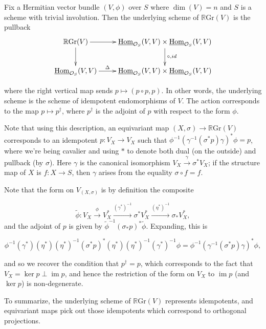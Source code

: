 \documentclass[edeposit,fullpage]{uiucthesis2009}
\newcommand{\mc}{\mathcal}
\newcommand{\RGr}{\mathbb R\mathrm{Gr}}
\DeclareMathOperator*{\im}{im}
\DeclareMathOperator{\Hom}{Hom}
\theoremstyle{plain}
\numberwithin{lemma}{section}
\theoremstyle{definition}
\begin{document}
Fix a Hermitian vector bundle $(V,\phi)$ over $S$ where $\dim(V) = n$
and $S$ is a scheme with
trivial involution. Then the underlying scheme of $\RGr(V)$ is the
pullback 
\[
\xymatrix{\RGr(V) \ar[r]\ar[d] & \uline{\Hom}_{\mc O_S}(V,V) \times
  \uline{\Hom}_{\mc O_S}(V,V) \ar[d]^{\circ, id} \\ \uline{\Hom}_{\mc
    O_S}(V,V) \ar[r]^-\Delta & \uline{\Hom}_{\mc O_S}(V,V) \times \uline{\Hom}_{\mc O_S}(V,V)}
\]

where the right vertical map sends $p \mapsto (p \circ p, p)$. In
other words, the underlying scheme is the scheme of idempotent
endomorphisms of $V$. The action corresponds to the map $p \mapsto
p^\dagger$, where $p^\dagger$ is the adjoint of $p$ with respect to
the form $\phi$. 

Note that using this description, an equivariant map $(X,\sigma) \rightarrow
\RGr(V)$ corresponds to an idempotent $p : V_X \rightarrow V_X$ such
that $\phi^{-1}(\gamma^{-1}(\sigma^*p)\gamma)^*\phi = p$, where we're being cavalier
and using $\ast$ to denote both dual (on the outside) and pullback (by
$\sigma$). Here $\gamma$ is the canonical isomorphism $V_X
\xrightarrow{\gamma} \sigma^*V_X$; if the structure map of $X$ is $f :
X \rightarrow S$, then $\gamma$ arises from the equality $\sigma \circ f = f$.

Note that the form on $V_{(X,\sigma)}$ is by definition the composite

\[
\widetilde \phi : V_X \xrightarrow{\phi} V_X^* \xrightarrow{(\gamma^*)^{-1}} \sigma^*V_X^*
\xrightarrow{(\eta^*)^{-1}} \sigma_*V_X^*,
\]
and the adjoint of $p$ is given by $\widetilde \phi^{-1} (\sigma_*p)^*
\widetilde \phi$. Expanding, this is

\[
\phi^{-1}(\gamma^*)(\eta^*)(\eta^*)^{-1}(\sigma^*p)^*(\eta^*)(\eta^*)^{-1}(\gamma^*)^{-1}\phi
= \phi^{-1}(\gamma^{-1}(\sigma^*p)\gamma)^*\phi,
\]

and so we recover the condition that $p^\dagger  =  p$, which
corresponds to the fact that $V_X = \ker p \perp \im p$, and hence the
restriction of the form on $V_X$ to $\im p$ (and $\ker p$) is
non-degenerate. 

To summarize, the underlying scheme of $\RGr(V)$ represents
idempotents, and equivariant maps pick out those idempotents which
correspond to orthogonal projections. 
\end{document}
